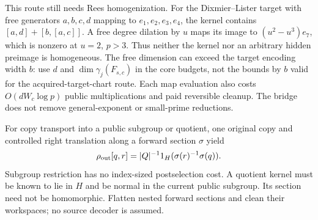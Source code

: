 \documentclass[11pt]{article}
\theoremstyle{remark}
\begin{document}
This route still needs Rees homogenization. For the Dixmier--Lister
target with free generators $a,b,c,d$ mapping to $e_1,e_2,e_3,e_4$,
the kernel contains $[a,d]+[b,[a,c]]$. A free degree dilation by $u$
maps its image to $(u^2-u^3)e_7$, which is nonzero at $u=2$, $p>3$.
Thus neither the kernel nor an arbitrary hidden preimage is homogeneous.
The free dimension can exceed the target encoding width $b$: use $d$
and $\dim\gamma_j(F_{s,c})$ in the core budgets, not the bounds by $b$
valid for the acquired-target-chart route. Each map evaluation also costs
$O(dW_c\log p)$ public multiplications and paid reversible cleanup.
The bridge does not remove general-exponent or small-prime reductions.

For copy transport into a public subgroup or quotient, one original copy
and controlled right translation along a forward section $\sigma$ yield
\[
 \rho_{\rm out}[q,r]=|Q|^{-1}
             1_H(\sigma(r)^{-1}\sigma(q)).
\]
Subgroup restriction has no index-sized postselection cost. A quotient
kernel must be known to lie in $H$ and be normal in the current public
subgroup. Its section need not be homomorphic. Flatten nested forward
sections and clean their workspaces; no source decoder is assumed.
\end{document}
